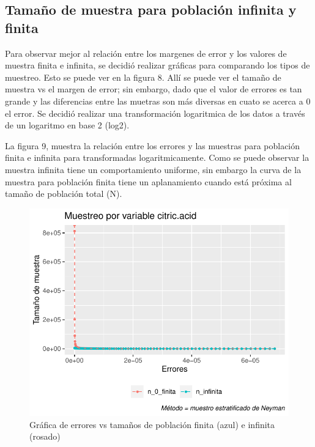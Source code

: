 \documentclass[
]{article}
\begin{document}
\hypertarget{tamauxf1o-de-muestra-para-poblaciuxf3n-infinita-y-finita}{%
\subsection{Tamaño de muestra para población infinita y
finita}\label{tamauxf1o-de-muestra-para-poblaciuxf3n-infinita-y-finita}}

Para observar mejor al relación entre los margenes de error y los
valores de muestra finita e infinita, se decidió realizar gráficas para
comparando los tipos de muestreo. Esto se puede ver en la figura 8. Allí
se puede ver el tamaño de muestra vs el margen de error; sin embargo,
dado que el valor de errores es tan grande y las diferencias entre las
muetras son más diversas en cuato se acerca a 0 el error. Se decidió
realizar una transformación logaritmica de los datos a través de un
logaritmo en base 2 (log2).

La figura 9, muestra la relación entre los errores y las muestras para
población finita e infinita para transformadas logaritmicamente. Como se
puede observar la muestra infinita tiene un comportamiento uniforme, sin
embargo la curva de la muestra para población finita tiene un
aplanamiento cuando está próxima al tamaño de población total (N).

\begin{figure}
\centering
\includegraphics{test_2_files/figure-latex/grap uno de errores-1.pdf}
\caption{Gráfica de errores vs tamaños de población finita (azul) e
infinita (rosado)}
\end{figure}
\end{document}
